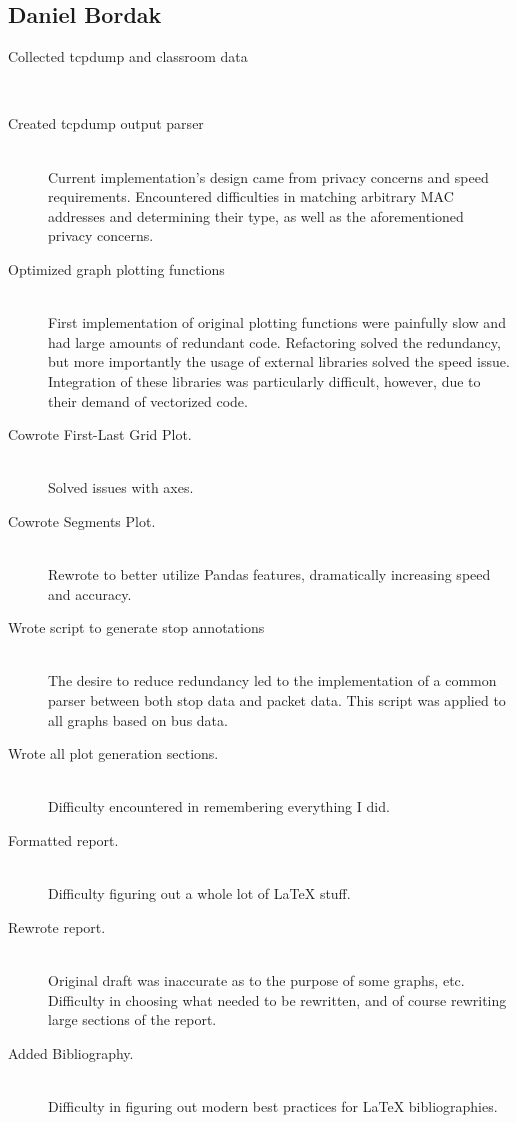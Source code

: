 \documentclass[12pt,journal,compsoc]{IEEEtran} %
\newcommand{\ditem}[2]{\item[#1] \hfill \\ #2}
\begin{document}





\FloatBarrier

\printbibliography

\subsection*{Daniel Bordak}
\begin{description}
\ditem{Collected tcpdump and classroom data}{}
\ditem{Created tcpdump output parser}{
  Current implementation's design came from privacy concerns and speed requirements.
  Encountered difficulties in matching arbitrary MAC addresses and determining their type, as well as the aforementioned privacy concerns.
}
\ditem{Optimized graph plotting functions}{
  First implementation of original plotting functions were painfully slow and had large amounts of redundant code.
  Refactoring solved the redundancy, but more importantly the usage of external libraries solved the speed issue.
  Integration of these libraries was particularly difficult, however, due to their demand of vectorized code.
}
\ditem{Cowrote First-Last Grid Plot.}{
  Solved issues with axes.
}
\ditem{Cowrote Segments Plot.}{
  Rewrote to better utilize Pandas features, dramatically increasing speed and accuracy.
}
\ditem{Wrote script to generate stop annotations}{
  The desire to reduce redundancy led to the implementation of a common parser between both stop data and packet data.
  This script was applied to all graphs based on bus data.
}
\ditem{Wrote all plot generation sections.}{
  Difficulty encountered in remembering everything I did.%
}
\ditem{Formatted report.}{
  Difficulty figuring out a whole lot of \LaTeX\xspace stuff.
}
\ditem{Rewrote report.}{
  Original draft was inaccurate as to the purpose of some graphs, etc.
  Difficulty in choosing what needed to be rewritten, and of course rewriting large sections of the report.
}
\ditem{Added Bibliography.}{
  Difficulty in figuring out modern best practices for \LaTeX\xspace bibliographies.
}
\end{description}
\end{document}
